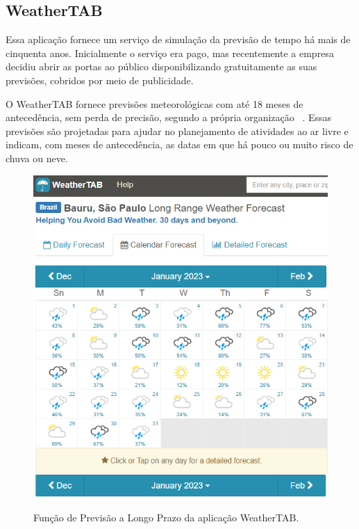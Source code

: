 \subsection{WeatherTAB}
\label{ss.weathertab}
Essa aplicação fornece um serviço de simulação da previsão de tempo há mais de cinquenta anos. Inicialmente o serviço era pago, mas recentemente a empresa decidiu abrir as portas ao público disponibilizando gratuitamente as suas previsões, cobridos por meio de publicidade.

O WeatherTAB fornece previsões meteorológicas com até 18 meses de antecedência, sem perda de precisão, segundo a própria organização ~\cite{weathertab}. Essas previsões são projetadas para ajudar no planejamento de atividades ao ar livre e indicam, com meses de antecedência, as datas em que há pouco ou muito risco de chuva ou neve.

\begin{figure}[H]
	\caption{\small Função de Previsão a Longo Prazo da aplicação WeatherTAB.}
	\centering
	\includegraphics[scale=0.75]{figs/wtab-forecast.png}
	\label{f.darksky-calendar}
\end{figure}